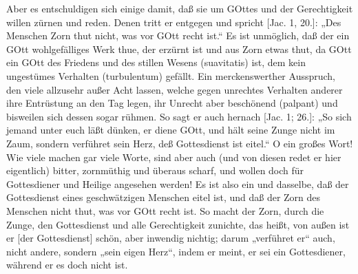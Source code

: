 Aber es entschuldigen sich einige damit, daß sie um GOttes und der Gerechtigkeit willen zürnen und reden. Denen tritt er entgegen und spricht [Jac. 1, 20.]: „Des Menschen Zorn thut nicht, was vor GOtt recht ist.“ Es ist unmöglich, daß der ein GOtt wohlgefälliges Werk thue, der erzürnt ist und aus Zorn etwas thut, da GOtt ein GOtt des Friedens und des stillen Wesens (suavitatis) ist, dem kein ungestümes Verhalten (turbulentum) gefällt. Ein merckenswerther Ausspruch, den viele allzusehr außer Acht lassen, welche gegen unrechtes Verhalten anderer ihre Entrüstung an den Tag legen, ihr Unrecht aber beschönend (palpant) und bisweilen sich dessen sogar rühmen. So sagt er auch hernach [Jac. 1; 26.]: „So sich jemand unter euch läßt dünken, er diene GOtt, und hält seine Zunge nicht im Zaum, sondern verführet sein Herz, deß Gottesdienst ist eitel.“ O ein großes Wort! Wie viele machen gar viele Worte, sind aber auch (und von diesen redet er hier eigentlich) bitter, zornmüthig und überaus scharf, und wollen doch für Gottesdiener und Heilige angesehen werden! Es ist also ein und dasselbe, daß der Gottesdienst eines geschwätzigen Menschen eitel ist, und daß der Zorn des Menschen nicht thut, was vor GOtt recht ist. So macht der Zorn, durch die Zunge, den Gottesdienst und alle Gerechtigkeit zunichte, das heißt, von außen ist er [der Gottesdienst] schön, aber inwendig nichtig; darum „verführet er“ auch, nicht andere, sondern
„sein eigen Herz“, indem er meint, er sei ein Gottesdiener, während er es doch nicht ist.

